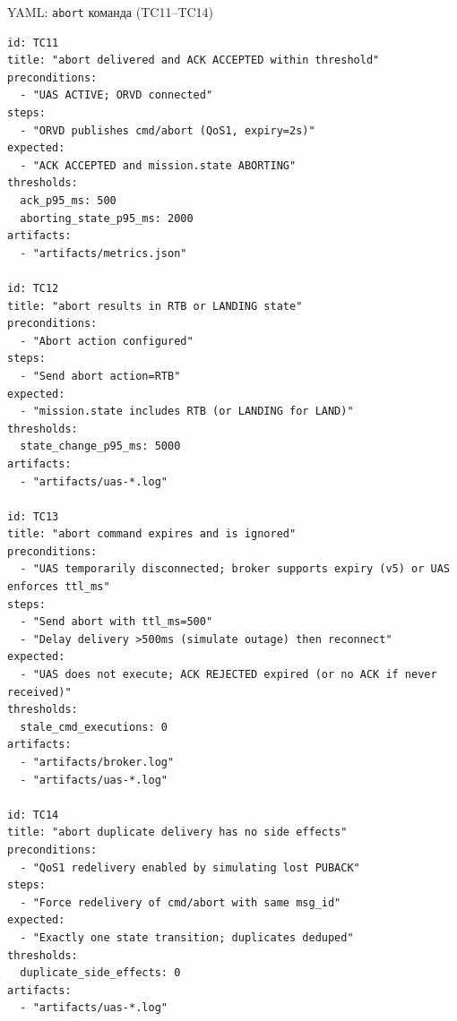 \documentclass[aspectratio=169]{beamer}
\begin{document}
\begin{frame}{YAML: \texttt{abort} команда (TC11--TC14)}
\small
\begin{verbatim}
id: TC11
title: "abort delivered and ACK ACCEPTED within threshold"
preconditions:
  - "UAS ACTIVE; ORVD connected"
steps:
  - "ORVD publishes cmd/abort (QoS1, expiry=2s)"
expected:
  - "ACK ACCEPTED and mission.state ABORTING"
thresholds:
  ack_p95_ms: 500
  aborting_state_p95_ms: 2000
artifacts:
  - "artifacts/metrics.json"

id: TC12
title: "abort results in RTB or LANDING state"
preconditions:
  - "Abort action configured"
steps:
  - "Send abort action=RTB"
expected:
  - "mission.state includes RTB (or LANDING for LAND)"
thresholds:
  state_change_p95_ms: 5000
artifacts:
  - "artifacts/uas-*.log"

id: TC13
title: "abort command expires and is ignored"
preconditions:
  - "UAS temporarily disconnected; broker supports expiry (v5) or UAS enforces ttl_ms"
steps:
  - "Send abort with ttl_ms=500"
  - "Delay delivery >500ms (simulate outage) then reconnect"
expected:
  - "UAS does not execute; ACK REJECTED expired (or no ACK if never received)"
thresholds:
  stale_cmd_executions: 0
artifacts:
  - "artifacts/broker.log"
  - "artifacts/uas-*.log"

id: TC14
title: "abort duplicate delivery has no side effects"
preconditions:
  - "QoS1 redelivery enabled by simulating lost PUBACK"
steps:
  - "Force redelivery of cmd/abort with same msg_id"
expected:
  - "Exactly one state transition; duplicates deduped"
thresholds:
  duplicate_side_effects: 0
artifacts:
  - "artifacts/uas-*.log"
\end{verbatim}
\end{frame}
\end{document}
